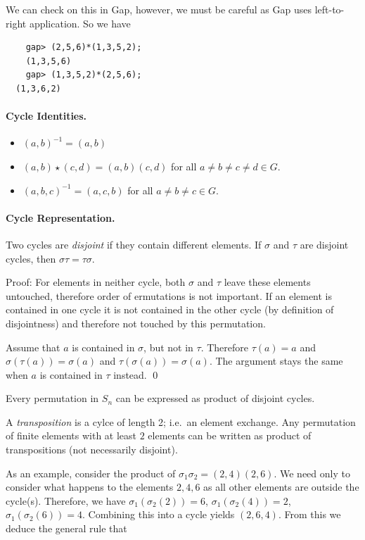 We can check on this in Gap, however, we must be careful as Gap uses left-to-right application. So we have

\begin{verbatim}
    gap> (2,5,6)*(1,3,5,2);
    (1,3,5,6)
    gap> (1,3,5,2)*(2,5,6);
  (1,3,6,2)
\end{verbatim}

\paragraph{Cycle Identities.} 

\begin{itemize}
  \item $(a,b)^{-1} = (a,b)$
  \item $(a,b) \star (c,d) = (a,b)(c,d)$ for all $a \neq b \neq c \neq d \in G$.
  \item $(a,b,c)^{-1} = (a,c,b)$ for all $a \neq b \neq c \in G$.
\end{itemize}



\paragraph{Cycle Representation.} Two cycles are \emph{disjoint} if they contain different elements. If $\sigma$ and $\tau$ are disjoint cycles, then $\sigma \tau = \tau \sigma$.

Proof: For elements in neither cycle, both $\sigma$ and $\tau$ leave these elements untouched, therefore order of  ermutations is not important. If an element is contained in one cycle it is not contained in the other cycle (by definition of disjointness) and therefore not touched by this permutation.

Assume that $a$ is contained in $\sigma$, but not in $\tau$. Therefore $\tau(a) = a$ and $\sigma(\tau(a)) = \sigma(a)$ and $\tau(\sigma(a)) = \sigma(a)$. The argument stays the same when $a$ is contained in $\tau$ instead. \qed

Every permutation in $S_n$ can be expressed as product of disjoint cycles.

A \emph{transposition} is a cylce of length 2; i.e.~an element exchange. Any permutation of finite elements with at least $2$ elements can be written as product of transpositions (not necessarily disjoint).

As an example, consider the product of $\sigma_1 \sigma_2 = (2,4)(2,6)$. We need only to consider what happens to the elements $2,4,6$ as all other elements are outside the cycle(s). Therefore, we have $\sigma_1(\sigma_2(2)) = 6$, $\sigma_1(\sigma_2(4)) = 2$, $\sigma_1(\sigma_2(6)) = 4$. Combining this into a cycle yields $(2,6,4)$. From this we deduce the general rule that


